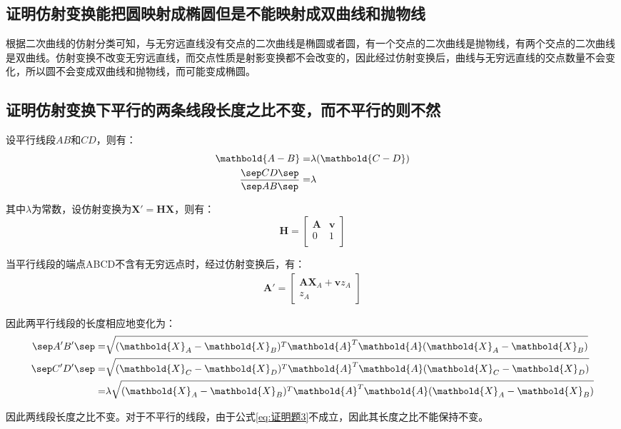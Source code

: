 \documentclass[11pt]{article}
\begin{document}
\subsection{证明仿射变换能把圆映射成椭圆但是不能映射成双曲线和抛物线}
根据二次曲线的仿射分类可知，与无穷远直线没有交点的二次曲线是椭圆或者圆，有一个交点的二次曲线是抛物线，有两个交点的二次曲线是双曲线。仿射变换不改变无穷远直线，而交点性质是射影变换都不会改变的，因此经过仿射变换后，曲线与无穷远直线的交点数量不会变化，所以圆不会变成双曲线和抛物线，而可能变成椭圆。
\subsection{证明仿射变换下平行的两条线段长度之比不变，而不平行的则不然}
设平行线段$AB$和$CD$，则有：
\begin{equation}
  \begin{aligned}
    \mathbold{A-B}=                    & \lambda(\mathbold{C-D}) \\
    \frac{\sep CD\sep }{\sep AB\sep }= & \lambda
  \end{aligned}\label{eq:证明题3}
\end{equation}\par
其中$\lambda$为常数，设仿射变换为$\mathbold{X}'=\mathbold{HX}$，则有：
$$
  \mathbold{H}=\begin{bmatrix}
    \mathbold{A} & \mathbold{v} \\
    0            & 1            \\
  \end{bmatrix}
$$\par
当平行线段的端点ABCD不含有无穷远点时，经过仿射变换后，有：
$$
  \begin{aligned}
    \mathbold{A}'=\begin{bmatrix}
                    \mathbold{AX}_A+\mathbold{v}z_A \\
                    z_A
                  \end{bmatrix}
  \end{aligned}
$$\par
因此两平行线段的长度相应地变化为：
$$
  \begin{aligned}
    \sep A'B'\sep = & \sqrt{(\mathbold{X}_A-\mathbold{X}_B)^T\mathbold{A}^T\mathbold{A}(\mathbold{X}_A-\mathbold{X}_B)}        \\
    \sep C'D'\sep = & \sqrt{(\mathbold{X}_C-\mathbold{X}_D)^T\mathbold{A}^T\mathbold{A}(\mathbold{X}_C-\mathbold{X}_D)}        \\
    =               & \lambda\sqrt{(\mathbold{X}_A-\mathbold{X}_B)^T\mathbold{A}^T\mathbold{A}(\mathbold{X}_A-\mathbold{X}_B)} \\
  \end{aligned}
$$\par
因此两线段长度之比不变。对于不平行的线段，由于公式\ref{eq:证明题3}不成立，因此其长度之比不能保持不变。
\end{document}
